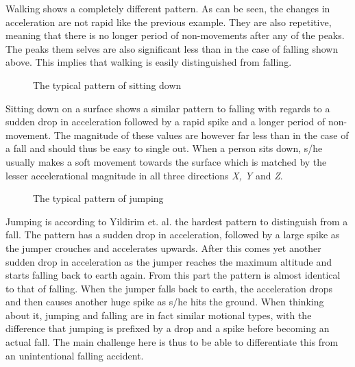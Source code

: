 \documentclass[12pt, a4paper, onecolumn]{article}
\begin{document}
	\noindent Walking shows a completely different pattern. As can be seen, the changes in acceleration are not rapid like the previous example. They are also repetitive, meaning that there is no longer period of non-movements after any of the peaks. The peaks them selves are also significant less than in the case of falling shown above. This implies that walking is easily distinguished from falling.
	
	
	
	\begin{figure}[h]
		\centering
		\caption{The typical pattern of sitting down}%
		\label{fig:example}%
	\end{figure}
	
	\noindent Sitting down on a surface shows a similar pattern to falling with regards to a sudden drop in acceleration followed by  a rapid spike and a longer period of non-movement. The magnitude of these values are however far less than in the case of a fall and should thus be easy to single out. When a person sits down, s/he usually makes a soft movement towards the surface which is matched by the lesser accelerational  magnitude in all three directions \textit{X, Y} and \textit{Z}.
	
	
	\begin{figure}[h]
		\centering
		\caption{The typical pattern of jumping}%
		\label{fig:example}%
	\end{figure}
	
	\noindent Jumping is according to Yildirim et. al. the hardest pattern to distinguish from a fall. The pattern has a sudden drop in acceleration, followed by a large spike as the jumper crouches and accelerates upwards. After this comes yet another sudden drop in acceleration as the jumper reaches the maximum altitude and starts falling back to earth again. From this part the pattern is almost identical to that of falling. When the jumper falls back to earth, the acceleration drops and then causes another huge spike as s/he hits the ground. When thinking about it, jumping and falling are in fact similar motional types, with the difference that jumping is prefixed by a drop and a spike before becoming an actual fall. The main challenge here is thus to be able to differentiate this from an unintentional falling accident.
	
\end{document}
